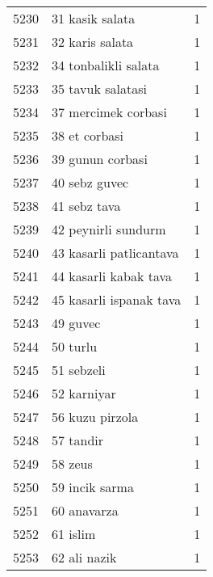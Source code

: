 \begin{tabular}{llr}
5230 &                                    31 kasik salata &      1 \\
5231 &                                    32 karis salata &      1 \\
5232 &                               34 tonbalikli salata &      1 \\
5233 &                                  35 tavuk salatasi &      1 \\
5234 &                                37 mercimek corbasi &      1 \\
5235 &                                      38 et corbasi &      1 \\
5236 &                                   39 gunun corbasi &      1 \\
5237 &                                      40 sebz guvec &      1 \\
5238 &                                       41 sebz tava &      1 \\
5239 &                                42 peynirli sundurm &      1 \\
5240 &                            43 kasarli patlicantava &      1 \\
5241 &                              44 kasarli kabak tava &      1 \\
5242 &                            45 kasarli ispanak tava &      1 \\
5243 &                                           49 guvec &      1 \\
5244 &                                           50 turlu &      1 \\
5245 &                                         51 sebzeli &      1 \\
5246 &                                        52 karniyar &      1 \\
5247 &                                    56 kuzu pirzola &      1 \\
5248 &                                          57 tandir &      1 \\
5249 &                                            58 zeus &      1 \\
5250 &                                     59 incik sarma &      1 \\
5251 &                                        60 anavarza &      1 \\
5252 &                                           61 islim &      1 \\
5253 &                                       62 ali nazik &      1 \\

\end{tabular}
